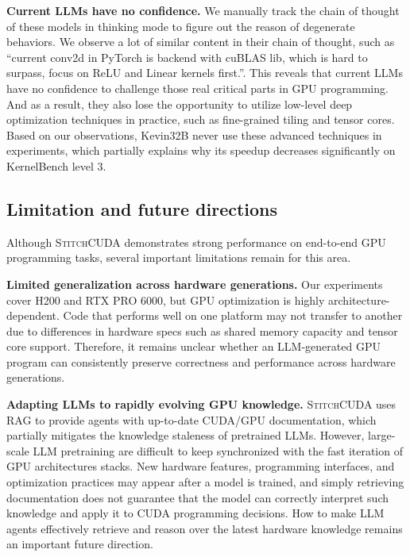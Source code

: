 \textbf{Current LLMs have no confidence.} We manually track the chain of thought of these models in thinking mode to figure out the reason of degenerate behaviors. We observe a lot of similar content in their chain of thought, such as “current conv2d in PyTorch is backend with cuBLAS lib, which is hard to surpass, focus on ReLU and Linear kernels first.”. This reveals that current LLMs have no confidence to challenge those real critical parts in GPU programming. And as a result, they also lose the opportunity to utilize low-level deep optimization techniques in practice, such as fine-grained tiling and tensor cores. Based on our observations, Kevin32B never use these advanced techniques in experiments, which partially explains why its speedup decreases significantly on KernelBench level 3. 

\subsection{Limitation and future directions}
Although \textsc{StitchCUDA} demonstrates strong performance on end-to-end GPU programming tasks, several important limitations remain for this area.

\textbf{Limited generalization across hardware generations.}
Our experiments cover H200 and RTX PRO 6000, but GPU optimization is highly architecture-dependent. Code that performs well on one platform may not transfer to another due to differences in hardware specs such as shared memory capacity and tensor core support.  Therefore, it remains unclear whether an LLM-generated GPU program can consistently preserve correctness and performance across hardware generations.

\textbf{Adapting LLMs to rapidly evolving GPU knowledge.}
\textsc{StitchCUDA} uses RAG to provide agents with up-to-date CUDA/GPU documentation, which partially mitigates the knowledge staleness of pretrained LLMs. However, large-scale LLM pretraining  are difficult to keep synchronized with the fast iteration of GPU architectures stacks. New hardware features, programming interfaces, and optimization practices may appear after a model is trained, and simply retrieving documentation does not guarantee that the model can correctly interpret such knowledge and apply it to CUDA programming decisions. How to make LLM agents effectively retrieve and reason over the latest hardware knowledge remains an important future direction.

